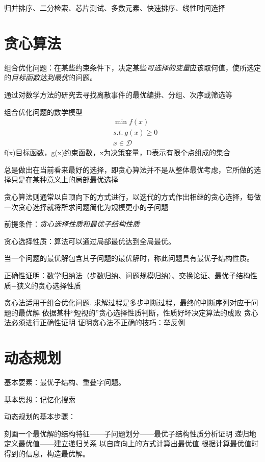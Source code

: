 \documentclass[twocolumn,zihao=5,linespread=1,heading=false,autoindent=0pt]{ctexart}
\theoremstyle{exampstyle} \newtheorem{definition}{定义}[section]
\theoremstyle{exampstyle} \newtheorem{example}{例}[section]
\theoremstyle{exampstyle} \newtheorem{theorem}{定理}[section]
\theoremstyle{exampstyle} \newtheorem{lemma}{引理}[section]
\theoremstyle{exampstyle} \newtheorem{myproof}{证明}[section]
\begin{document}
归并排序、二分检索、芯片测试、多数元素、快速排序、线性时间选择

\section{贪心算法}
组合优化问题：在某些约束条件下，决定某些\emph{可选择的变量}应该取何值，使所选定的\emph{目标函数达到最优}的问题。

通过对数学方法的研究去寻找离散事件的最优编排、分组、次序或筛选等

组合优化问题的数学模型
\begin{align*}
    & \min f(x) \\
    & s.t.\ g(x) \ge 0 \\
    & x \in \mathcal{D}
\end{align*}
f(x)目标函数，g(x)约束函数，x为决策变量，D表示有限个点组成的集合

总是做出在当前看来最好的选择，即贪心算法并不是从整体最优考虑，它所做的选择只是在某种意义上的局部最优选择

贪心算法则通常以自顶向下的方式进行，以迭代的方式作出相继的贪心选择，每做一次贪心选择就将所求问题简化为规模更小的子问题

前提条件：\emph{贪心选择性质和最优子结构性质}

贪心选择性质：算法可以通过局部最优达到全局最优。

当一个问题的最优解包含其子问题的最优解时，称此问题具有最优子结构性质。

正确性证明：数学归纳法（步数归纳、问题规模归纳）、交换论证、最优子结构性质+狭义的贪心选择性质

\begin{outline}[citemize]
    \1 贪心法适用于组合优化问题.
    \1 求解过程是多步判断过程，最终的判断序列对应于问题的最优解 
    \1 依据某种“短视的”贪心选择性质判断，性质好坏决定算法的成败
    \1 贪心法必须进行正确性证明
    \1 证明贪心法不正确的技巧：举反例
\end{outline}
\section{动态规划}
基本要素：最优子结构、重叠字问题。

基本思想：记忆化搜索

动态规划的基本步骤：

刻画一个最优解的结构特征——子问题划分——最优子结构性质分析证明
递归地定义最优值——建立递归关系
以自底向上的方式计算出最优值
根据计算最优值时得到的信息，构造最优解。
\end{document}
